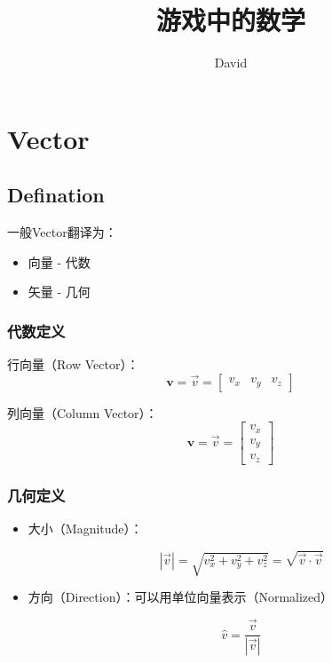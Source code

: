 \documentclass[11pt,a4paper]{report}
\author{David}
\title{游戏中的数学}
\begin{document}
 
\maketitle
\tableofcontents


\chapter{Vector}
\section{Defination}

一般Vector翻译为：

\begin{itemize}
\item 向量  - 代数
\item 矢量  - 几何
\end{itemize}

 \subsection{代数定义}

行向量（Row Vector）：
\[
\mathbf{v} = \vec{v} =   \begin{bmatrix}
v_x & v_y  &  v_z
\end{bmatrix}
\]

列向量（Column Vector）：
\[
\mathbf{v} = \vec{v} =   \begin{bmatrix}
v_x \\
v_y \\
v_z
\end{bmatrix}
\]

\subsection{几何定义}

\begin{center}
\end{center}


\begin{itemize}
\item 大小（Magnitude）：

\[
|\vec{v}| = \sqrt{v_x^2 + v_y^2 + v_z^2} = \sqrt{\vec{v}\cdot\vec{v}}
\]

\item 方向（Direction）：可以用单位向量表示（Normalized）

\[
\hat{v} =\frac{\vec{v}}{|\vec{v}|}
\]


\end{itemize}
\end{document}
